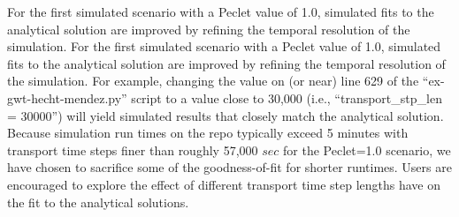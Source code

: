 For the first simulated scenario with a Peclet value of 1.0, simulated fits to the analytical solution are improved by refining the temporal resolution of the simulation.  For the first simulated scenario with a Peclet value of 1.0, simulated fits to the analytical solution are improved by refining the temporal resolution of the simulation.  For example, changing the value on (or near) line 629 of the ``ex-gwt-hecht-mendez.py'' script to a value close to 30,000 (i.e., ``transport\_stp\_len = 30000'') will yield simulated results that closely match the analytical solution.  Because simulation run times on the repo typically exceed 5 minutes with transport time steps finer than roughly 57,000 $sec$ for the Peclet=1.0 scenario, we have chosen to sacrifice some of the goodness-of-fit for shorter runtimes.  Users are encouraged to explore the effect of different transport time step lengths have on the fit to the analytical solutions.